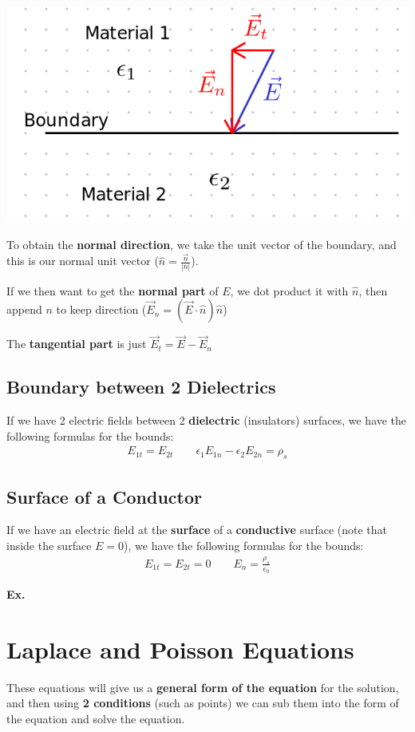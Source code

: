 \documentclass[12pt,letterpaper]{article} \usepackage{amsmath} \usepackage{graphicx} \usepackage[margin=1in]{geometry} \usepackage{longtable}  \usepackage{amssymb}
\begin{document}
	\begin{center}
		\includegraphics[width=0.55\linewidth]{../MAT2377/boundary-conditions-E}
	\end{center}
	
	
	To obtain the \textbf{normal direction}, we take the unit vector of the boundary, and this is our normal unit vector ($\hat n = \frac{\vec n}{|n|}$).
	
	If we then want to get the \textbf{normal part} of $E$, we dot product it with $\hat n$, then append $n$ to keep direction ($\vec E_n = (\vec E\cdot \hat n)\hat n$)
	
	The \textbf{tangential part }is just $\vec E_t = \vec E - \vec E_n$

	\subsection{Boundary between 2 Dielectrics}
	If we have 2 electric fields between 2 \textbf{dielectric} (insulators) surfaces, we have the following formulas for the bounds:
	\begin{align*}
		E_{1t} = E_{2t} \qquad \epsilon_1E_{1n}-\epsilon_2 E_{2n} = \rho_s
	\end{align*}

	\subsection{Surface of a Conductor}
	If we have an electric field at the \textbf{surface }of a \textbf{conductive} surface (note that inside the surface $E=0$), we have the following formulas for the bounds:
	\begin{align*}
		E_{1t} = E_{2t} = 0 \qquad E_{n} = \frac{\rho_s}{\epsilon_0}
	\end{align*}

	\begin{mdframed}
		\textbf{Ex. }
	\end{mdframed}

	\section{Laplace and Poisson Equations}
	These equations will give us a \textbf{general form of the equation} for the solution, and then using \textbf{2 conditions} (such as points) we can sub them into the form of the equation and solve the equation. 
	
\end{document}
